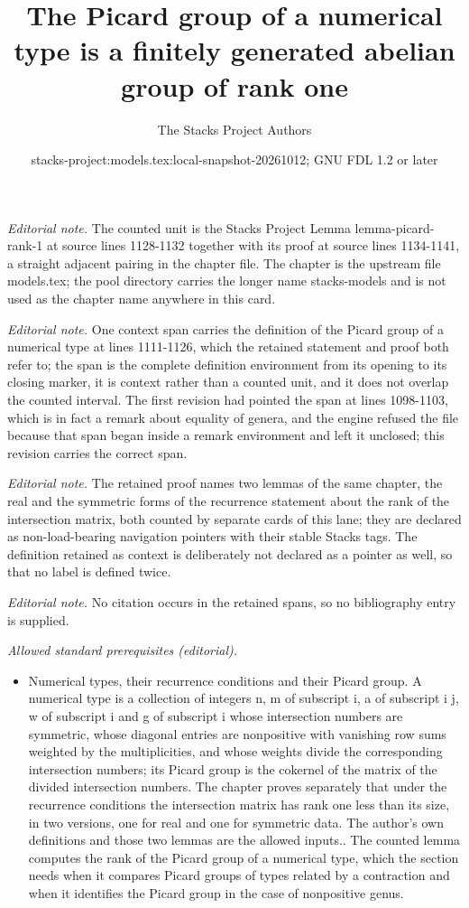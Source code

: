 \documentclass[10pt,a4paper]{amsart}
\title{The Picard group of a numerical type is a finitely generated abelian group of rank one}
\author{The Stacks Project Authors}
\date{stacks-project:models.tex:local-snapshot-20261012; GNU FDL 1.2 or later}
\theoremstyle{plain}
\theoremstyle{definition}
\theoremstyle{remark}
\numberwithin{equation}{subsection}
\begin{document}
\maketitle
\noindent\textit{Editorial note.} The counted unit is the Stacks Project Lemma lemma-picard-rank-1 at source lines 1128-1132 together with its proof at source lines 1134-1141, a straight adjacent pairing in the chapter file. The chapter is the upstream file models.tex; the pool directory carries the longer name stacks-models and is not used as the chapter name anywhere in this card.\par\medskip
\noindent\textit{Editorial note.} One context span carries the definition of the Picard group of a numerical type at lines 1111-1126, which the retained statement and proof both refer to; the span is the complete definition environment from its opening to its closing marker, it is context rather than a counted unit, and it does not overlap the counted interval. The first revision had pointed the span at lines 1098-1103, which is in fact a remark about equality of genera, and the engine refused the file because that span began inside a remark environment and left it unclosed; this revision carries the correct span.\par\medskip
\noindent\textit{Editorial note.} The retained proof names two lemmas of the same chapter, the real and the symmetric forms of the recurrence statement about the rank of the intersection matrix, both counted by separate cards of this lane; they are declared as non-load-bearing navigation pointers with their stable Stacks tags. The definition retained as context is deliberately not declared as a pointer as well, so that no label is defined twice.\par\medskip
\noindent\textit{Editorial note.} No citation occurs in the retained spans, so no bibliography entry is supplied.\par\medskip
\noindent\textit{Allowed standard prerequisites (editorial).}\begin{itemize}
\item Numerical types, their recurrence conditions and their Picard group. A numerical type is a collection of integers n, m of subscript i, a of subscript i j, w of subscript i and g of subscript i whose intersection numbers are symmetric, whose diagonal entries are nonpositive with vanishing row sums weighted by the multiplicities, and whose weights divide the corresponding intersection numbers; its Picard group is the cokernel of the matrix of the divided intersection numbers. The chapter proves separately that under the recurrence conditions the intersection matrix has rank one less than its size, in two versions, one for real and one for symmetric data. The author's own definitions and those two lemmas are the allowed inputs.. The counted lemma computes the rank of the Picard group of a numerical type, which the section needs when it compares Picard groups of types related by a contraction and when it identifies the Picard group in the case of nonpositive genus.
\end{itemize}\medskip
\end{document}
